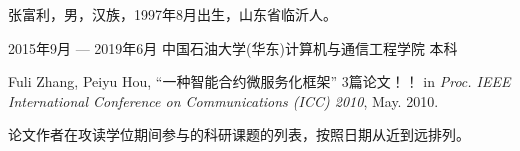 \documentclass[macfonts,master,oneside]{njuthesis}
\begin{document}
\backmatter
\begin{resume}
  \begin{authorinfo}
    \noindent 张富利，男，汉族，1997年8月出生，山东省临沂人。
  \end{authorinfo}
  \begin{education}
    \item[2015年9月 --- 2019年6月] 中国石油大学(华东)计算机与通信工程学院 \hfill 本科
  \end{education}
  \begin{publications}
    \item Fuli Zhang, Peiyu Hou,  ``一种智能合约微服务化框架''
    3篇论文！！ 
    in \textsl{Proc. IEEE International Conference on Communications (ICC) 2010}, May. 2010.
    \item  论文作者在攻读学位期间参与的科研课题的列表，按照日期从近到远排列。
  \end{publications}
 

\end{resume}


\end{document}
